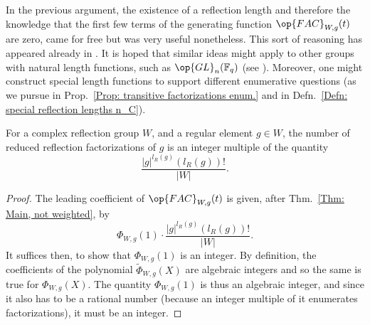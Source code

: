\begin{rema}
In the previous argument, the existence of a reflection length and therefore the knowledge that the first few terms of the generating function $\op{FAC}_{W,g}(t)$ are zero, came for free but was very useful nonetheless. This sort of reasoning has appeared already in \cite[end of proof of Thm.~2]{fpsac-paper-refl-length-trick}. It is hoped that similar ideas might apply to other groups with natural length functions, such as $\op{GL}_n(\mathbb{F}_q)$ (see \cite{lewis-morales-gln-fq-factorizations,reiner-lewis-stanton-singer-cycles}). Moreover, one might construct special length functions to support different enumerative questions (as we pursue in Prop.~\ref{Prop: transitive factorizations enum.} and in Defn.~\ref{Defn: special reflection lengths n_C}).  
\end{rema}

\begin{coro}\label{Corol: first of theorem}
For a complex reflection group $W$, and a regular element $g\in W$, the number of reduced reflection factorizations of $g$ is an integer multiple of the quantity 
\[
\dfrac{|g|^{l_R(g)}(l_R(g))!}{|W|}.
\]
\end{coro}
\begin{proof}
The leading coefficient of $\op{FAC}_{W,g}(t)$ is given, after Thm.~\ref{Thm: Main, not weighted}, by $$\Phi_{W,g}(1)\cdot\dfrac{|g|^{l_R(g)}(l_R(g))!}{|W|}.$$ It suffices then, to show that $\Phi_{W,g}(1)$ is an integer. By definition, the coefficients of the polynomial $\tilde{\Phi}_{W,g}(X)$ are algebraic integers and so the same is true for $\Phi_{W,g}(X)$. The quantity $\Phi_{W,g}(1)$ is thus an algebraic integer, and since it also has to be a rational number (because an integer multiple of it enumerates factorizations), it must be an integer.
\end{proof}

